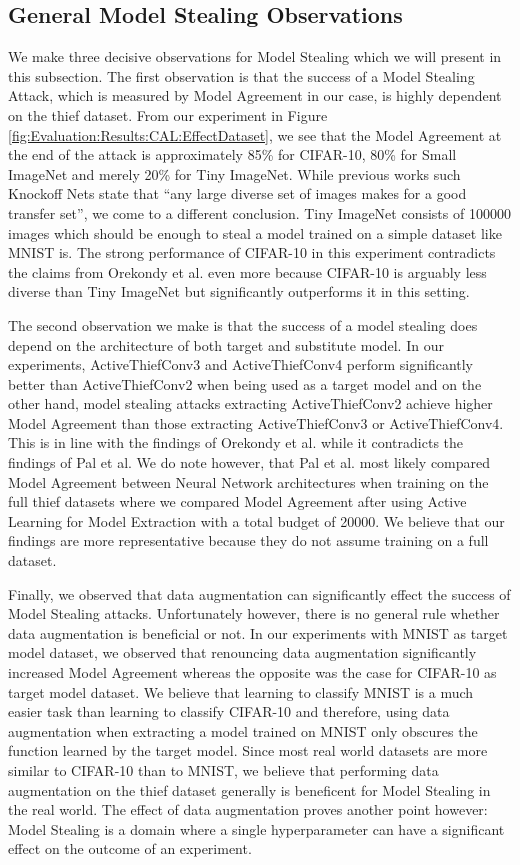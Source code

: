 \subsection{General Model Stealing Observations}
\label{sec:Discussion:ModelStealing:General}
We make three decisive observations for Model Stealing which we will present in this subsection. The first observation is that the success of a Model Stealing Attack, which
is measured by Model Agreement in our case, is highly dependent on the thief dataset. From our experiment in Figure \ref{fig:Evaluation:Results:CAL:EffectDataset}, we see
that the Model Agreement at the end of the attack is approximately 85\% for CIFAR-10, 80\% for Small ImageNet and merely 20\% for Tiny ImageNet. While previous works such
Knockoff Nets state that \enquote{any large diverse set of images makes for a good transfer set}, we come to a different conclusion. Tiny ImageNet consists of 100000 images
which should be enough to steal a model trained on a simple dataset like MNIST is. The strong performance of CIFAR-10 in this experiment contradicts the claims from
Orekondy et al. even more because CIFAR-10 is arguably less diverse than Tiny ImageNet but significantly outperforms it in this setting. \par
The second observation we make is that the success of a model stealing does depend on the architecture of both target and substitute model. In our experiments,
ActiveThiefConv3 and ActiveThiefConv4 perform significantly better than ActiveThiefConv2 when being used as a target model and on the other hand, model stealing attacks
extracting ActiveThiefConv2 achieve higher Model Agreement than those extracting ActiveThiefConv3 or ActiveThiefConv4. This is in line with the findings of Orekondy et al. 
while it contradicts the findings of Pal et al. We do note however, that Pal et al. most likely compared Model Agreement between Neural Network architectures when training
on the full thief datasets where we compared Model Agreement after using Active Learning for Model Extraction with a total budget of 20000. We believe that our findings
are more representative because they do not assume training on a full dataset. \par
Finally, we observed that data augmentation can significantly effect the success of Model Stealing attacks. Unfortunately however, there is no general rule whether data
augmentation is beneficial or not. In our experiments with MNIST as target model dataset, we observed that renouncing data augmentation significantly increased Model
Agreement whereas the opposite was the case for CIFAR-10 as target model dataset. We believe that learning to classify MNIST is a much easier task than learning to classify
CIFAR-10 and therefore, using data augmentation when extracting a model trained on MNIST only obscures the function learned by the target model. Since most real world
datasets are more similar to CIFAR-10 than to MNIST, we believe that performing data augmentation on the thief dataset generally is beneficent for Model Stealing
in the real world. The effect of data augmentation proves another point however: Model Stealing is a domain where a single hyperparameter can have a significant effect
on the outcome of an experiment.

